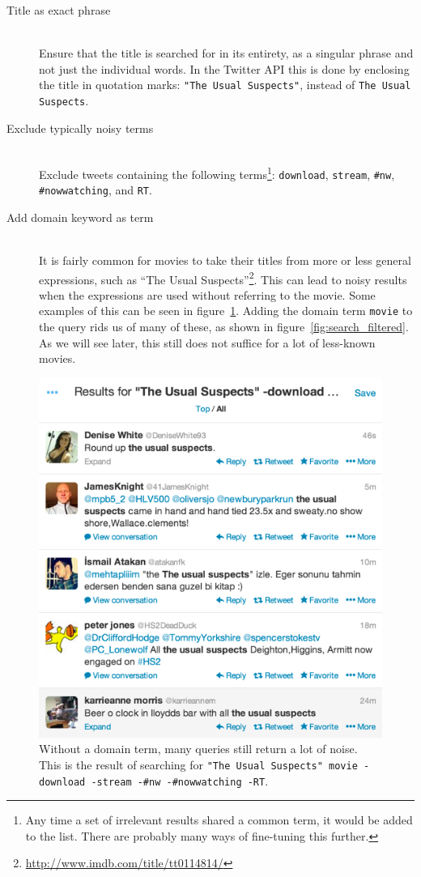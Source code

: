 \begin{description}
  \item[Title as exact phrase] \hfill \\
    Ensure that the title is searched for in its entirety, as a singular phrase and not just the individual words. In the Twitter API this is done by enclosing the title in quotation marks: \texttt{"The Usual Suspects"}, instead of \texttt{The Usual Suspects}.
  \item[Exclude typically noisy terms] \hfill \\
    Exclude tweets containing the following terms\footnote{Any time a set of irrelevant results shared a common term, it would be added to the list. There are probably many ways of fine-tuning this further.}: \texttt{download}, \texttt{stream}, \texttt{\#nw}, \texttt{\#nowwatching}, and \texttt{RT}.
  \item[Add domain keyword as term] \hfill \\
    It is fairly common for movies to take their titles from more or less general expressions, such as ``The Usual Suspects''\footnote{\url{http://www.imdb.com/title/tt0114814/}}. This can lead to noisy results when the expressions are used without referring to the movie. Some examples of this can be seen in figure~\ref{fig:search_simple_filtered}. Adding the domain term \texttt{movie} to the query rids us of many of these, as shown in figure~\ref{fig:search_filtered}. As we will see later, this still does not suffice for a lot of less-known movies.
\end{description}

\begin{figure}[h]
  \centering
    \includegraphics{Figures/search_simple_filtered}
  \caption{Without a domain term, many queries still return a lot of noise. This is the result of searching for \texttt{"The Usual Suspects" movie -download -stream -\#nw -\#nowwatching -RT}.}
  \label{fig:search_simple_filtered}
\end{figure}

